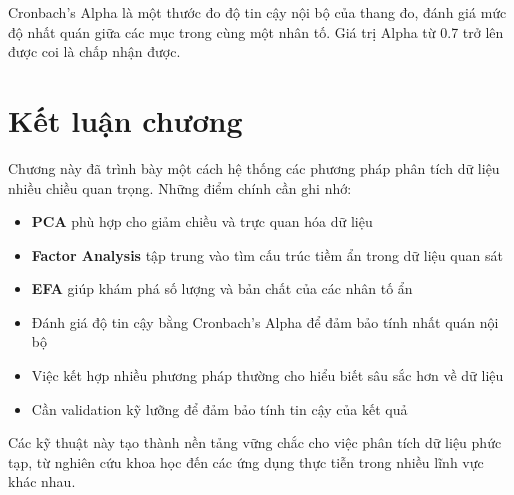 Cronbach's Alpha là một thước đo độ tin cậy nội bộ của thang đo, đánh giá mức độ nhất quán giữa các mục trong cùng một nhân tố. Giá trị Alpha từ 0.7 trở lên được coi là chấp nhận được.

\section{Kết luận chương}

Chương này đã trình bày một cách hệ thống các phương pháp phân tích dữ liệu nhiều chiều quan trọng. Những điểm chính cần ghi nhớ:

\begin{itemize}
    \item \textbf{PCA} phù hợp cho giảm chiều và trực quan hóa dữ liệu
    \item \textbf{Factor Analysis} tập trung vào tìm cấu trúc tiềm ẩn trong dữ liệu quan sát
    \item \textbf{EFA} giúp khám phá số lượng và bản chất của các nhân tố ẩn
    \item Đánh giá độ tin cậy bằng Cronbach's Alpha để đảm bảo tính nhất quán nội bộ
    \item Việc kết hợp nhiều phương pháp thường cho hiểu biết sâu sắc hơn về dữ liệu
    \item Cần validation kỹ lưỡng để đảm bảo tính tin cậy của kết quả
\end{itemize}

Các kỹ thuật này tạo thành nền tảng vững chắc cho việc phân tích dữ liệu phức tạp, từ nghiên cứu khoa học đến các ứng dụng thực tiễn trong nhiều lĩnh vực khác nhau.